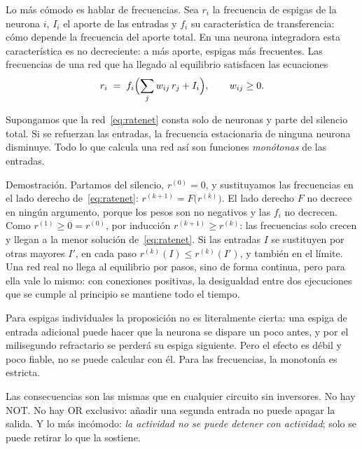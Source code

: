 Lo más cómodo es hablar de frecuencias. Sea $r_i$ la frecuencia de espigas de la neurona $i$, $I_i$ el aporte de las entradas y $f_i$ su característica de transferencia: cómo depende la frecuencia del aporte total. En una neurona integradora esta característica es no decreciente: a más aporte, espigas más frecuentes. Las frecuencias de una red que ha llegado al equilibrio satisfacen las ecuaciones
\begin{equation}
r_i \;=\; f_i\Bigl(\sum_j w_{ij}\,r_j + I_i\Bigr), \qquad w_{ij}\ge 0 .
\label{eq:ratenet}
\end{equation}

\begin{keyblock}
\begin{proposition}[Monotonía]
\label{prop:monotone}
Supongamos que la red~\eqref{eq:ratenet} consta solo de neuronas  y parte del silencio total. Si se refuerzan las entradas, la frecuencia estacionaria de ninguna neurona disminuye. Todo lo que calcula una red así son funciones \emph{monótonas} de las entradas.
\end{proposition}
\end{keyblock}

Demostración. Partamos del silencio, $r^{(0)}=0$, y sustituyamos las frecuencias en el lado derecho de~\eqref{eq:ratenet}: $r^{(k+1)}=F\bigl(r^{(k)}\bigr)$. El lado derecho $F$ no decrece en ningún argumento, porque los pesos son no negativos y las $f_i$ no decrecen. Como $r^{(1)}\ge0=r^{(0)}$, por inducción $r^{(k+1)}\ge r^{(k)}$: las frecuencias solo crecen y llegan a la menor solución de~\eqref{eq:ratenet}. Si las entradas $I$ se sustituyen por otras mayores $I'$, en cada paso $r^{(k)}(I)\le r^{(k)}(I')$, y también en el límite. Una red real no llega al equilibrio por pasos, sino de forma continua, pero para ella vale lo mismo: con conexiones positivas, la desigualdad entre dos ejecuciones que se cumple al principio se mantiene todo el tiempo.

Para espigas individuales la proposición no es literalmente cierta: una espiga de entrada adicional puede hacer que la neurona se dispare un poco antes, y por el milisegundo refractario se perderá su espiga siguiente. Pero el efecto es débil y poco fiable, no se puede calcular con él. Para las frecuencias, la monotonía es estricta.

Las consecuencias son las mismas que en cualquier circuito sin inversores. No hay NOT. No hay OR exclusivo: añadir una segunda entrada no puede apagar la salida. Y lo más incómodo: \emph{la actividad no se puede detener con actividad}; solo se puede retirar lo que la sostiene.

